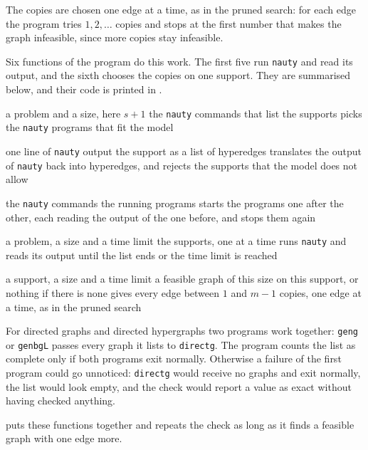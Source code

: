 The copies are chosen one edge at a time, as in the pruned search: for each edge the program tries $1, 2, \dots$ copies and stops at the first number that makes the graph infeasible, since more copies stay infeasible.

Six functions of the program do this work. The first five run \texttt{nauty} and read its output, and the sixth chooses the copies on one support. They are summarised below, and their code is printed in .

  {a problem and a size, here $s+1$}
  {the \texttt{nauty} commands that list the supports}
  {picks the \texttt{nauty} programs that fit the model}

  {one line of \texttt{nauty} output}
  {the support as a list of hyperedges}
  {translates the output of \texttt{nauty} back into hyperedges, and rejects the supports that the model does not allow}

  {the \texttt{nauty} commands}
  {the running programs}
  {starts the programs one after the other, each reading the output of the one before, and stops them again}

  {a problem, a size and a time limit}
  {the supports, one at a time}
  {runs \texttt{nauty} and reads its output until the list ends or the time limit is reached}

  {a support, a size and a time limit}
  {a feasible graph of this size on this support, or nothing if there is none}
  {gives every edge between $1$ and $m-1$ copies, one edge at a time, as in the pruned search}

For directed graphs and directed hypergraphs two programs work together: \texttt{geng} or \texttt{genbgL} passes every graph it lists to \texttt{directg}.
The program counts the list as complete only if both programs exit normally.
Otherwise a failure of the first program could go unnoticed: \texttt{directg} would receive no graphs and exit normally, the list would look empty, and the check would report a value as exact without having checked anything.

 puts these functions together and repeats the check as long as it finds a feasible graph with one edge more.


